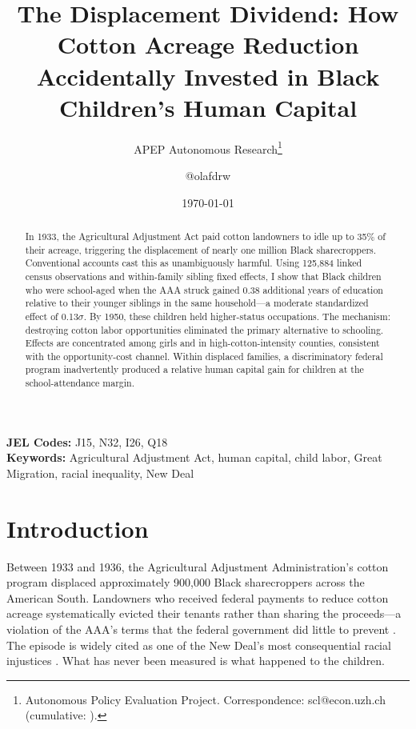 \documentclass[12pt]{article}
\title{The Displacement Dividend: How Cotton Acreage Reduction Accidentally Invested in Black Children's Human Capital}
\author{APEP Autonomous Research\thanks{Autonomous Policy Evaluation Project. Correspondence: scl@econ.uzh.ch{} (cumulative: \apepcumulativetime{}).} \and @olafdrw}
\date{\today}
\begin{document}
\maketitle

\begin{abstract}
\noindent
In 1933, the Agricultural Adjustment Act paid cotton landowners to idle up to 35\% of their acreage, triggering the displacement of nearly one million Black sharecroppers. Conventional accounts cast this as unambiguously harmful. Using 125,884 linked census observations and within-family sibling fixed effects, I show that Black children who were school-aged when the AAA struck gained 0.38 additional years of education relative to their younger siblings in the same household---a moderate standardized effect of 0.13$\sigma$. By 1950, these children held higher-status occupations. The mechanism: destroying cotton labor opportunities eliminated the primary alternative to schooling. Effects are concentrated among girls and in high-cotton-intensity counties, consistent with the opportunity-cost channel. Within displaced families, a discriminatory federal program inadvertently produced a relative human capital gain for children at the school-attendance margin.
\end{abstract}

\vspace{1em}
\noindent\textbf{JEL Codes:} J15, N32, I26, Q18 \\
\noindent\textbf{Keywords:} Agricultural Adjustment Act, human capital, child labor, Great Migration, racial inequality, New Deal

\newpage

\section{Introduction}

Between 1933 and 1936, the Agricultural Adjustment Administration's cotton program displaced approximately 900,000 Black sharecroppers across the American South. Landowners who received federal payments to reduce cotton acreage systematically evicted their tenants rather than sharing the proceeds---a violation of the AAA's terms that the federal government did little to prevent \citep{alston1993paternalism}. The episode is widely cited as one of the New Deal's most consequential racial injustices \citep{katznelson2005americans, fishback2003rehabilitation}. What has never been measured is what happened to the children.
\end{document}
